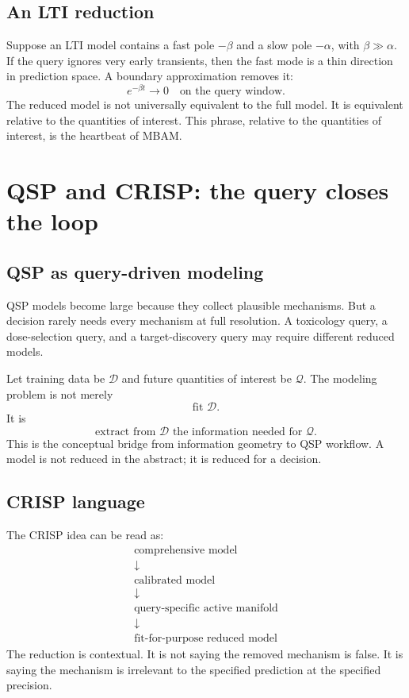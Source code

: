 \documentclass[a4paper]{article}
\newcommand{\qoi}{\mathcal{Q}}
\newcommand{\data}{\mathcal{D}}
\begin{document}
\subsection{An LTI reduction}

Suppose an LTI model contains a fast pole \(-\beta\) and a slow pole \(-\alpha\), with \(\beta\gg\alpha\).  If the query ignores very early transients, then the fast mode is a thin direction in prediction space.  A boundary approximation removes it:
\[
  e^{-\beta t}\to 0
  \quad\text{on the query window.}
\]
The reduced model is not universally equivalent to the full model.  It is equivalent relative to the quantities of interest.  This phrase, relative to the quantities of interest, is the heartbeat of MBAM.

\section{QSP and CRISP: the query closes the loop}

\subsection{QSP as query-driven modeling}

QSP models become large because they collect plausible mechanisms.  But a decision rarely needs every mechanism at full resolution.  A toxicology query, a dose-selection query, and a target-discovery query may require different reduced models.

Let training data be \(\data\) and future quantities of interest be \(\qoi\).  The modeling problem is not merely
\[
  \text{fit }\data.
\]
It is
\[
  \text{extract from }\data
  \text{ the information needed for }\qoi.
\]
This is the conceptual bridge from information geometry to QSP workflow.  A model is not reduced in the abstract; it is reduced for a decision.

\subsection{CRISP language}

The CRISP idea can be read as:
\[
  \begin{array}{c}
    \text{comprehensive model}\\
    \downarrow\\
    \text{calibrated model}\\
    \downarrow\\
    \text{query-specific active manifold}\\
    \downarrow\\
    \text{fit-for-purpose reduced model}
  \end{array}
\]
The reduction is contextual.  It is not saying the removed mechanism is false.  It is saying the mechanism is irrelevant to the specified prediction at the specified precision.
\end{document}
